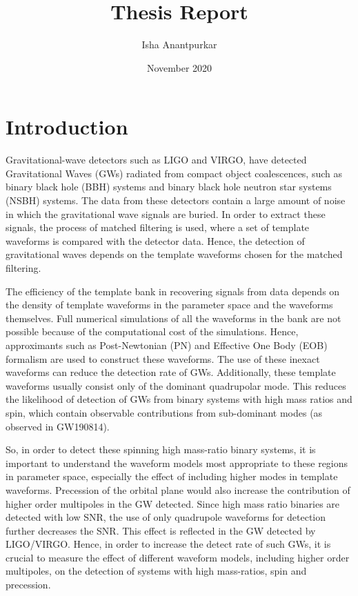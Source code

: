 \documentclass{article}
\title{Thesis Report}
\author{Isha Anantpurkar}
\date{November 2020}
\begin{document}
\maketitle

\section{Introduction}
Gravitational-wave detectors such as LIGO and VIRGO, have
detected Gravitational Waves (GWs) radiated from compact object
coalescences, such as binary black hole (BBH) systems and binary
black hole neutron star systems (NSBH) systems. The data from
these detectors contain a large amount of noise in which the
gravitational wave signals are buried. In order to extract these
signals, the process of matched filtering is used, where a set of
template waveforms is compared with the detector data. Hence, the
detection of gravitational waves depends on the template waveforms
chosen for the matched filtering. 

The efficiency of the template bank in recovering signals from data
depends on the density of template waveforms in the parameter space
and the waveforms themselves.
Full numerical simulations of all the waveforms
in the bank are not possible because of the computational cost of
the simulations. Hence, approximants such as Post-Newtonian
(PN) and Effective One Body (EOB) formalism are used to construct
these waveforms. The use of these inexact waveforms can reduce
the detection rate of GWs. Additionally, these template waveforms
usually consist only of the dominant quadrupolar mode.
This reduces the likelihood of detection of GWs from binary systems with high mass ratios and spin, which contain observable contributions from sub-dominant modes (as observed in GW190814).

So, in order to detect these spinning high mass-ratio binary systems, it is important to understand the waveform models most appropriate to these regions in parameter space, especially the effect of including higher modes in template waveforms. Precession of the orbital plane would also increase the contribution of higher order multipoles in the GW detected. Since high mass ratio binaries are detected with low SNR, the use of only quadrupole waveforms for detection further decreases the SNR. This effect is reflected in the GW detected by LIGO/VIRGO. Hence, in order to increase the detect rate of such GWs, it is crucial to measure the effect of different waveform models, including higher order multipoles, on the detection of systems with high mass-ratios, spin and precession.
\end{document}
